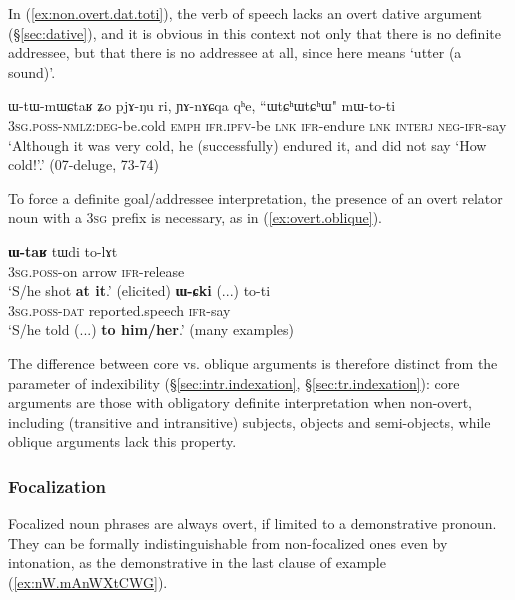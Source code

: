 In (\ref{ex:non.overt.dat.toti}), the verb of speech  lacks an overt dative argument (§\ref{sec:dative}), and it is obvious in this context not only that there is no definite addressee, but that there is no addressee at all, since  here means `utter (a sound)'. 

\begin{exe}
\ex \label{ex:non.overt.dat.toti}
\gll ɯ-tɯ-mɯɕtaʁ ʑo pjɤ-ŋu ri, ɲɤ-nɤɕqa qʰe, ``ɯtɕʰɯtɕʰɯ" mɯ-to-ti \\
\textsc{3sg}.\textsc{poss}-\textsc{nmlz}:\textsc{deg}-be.cold \textsc{emph} \textsc{ifr}.\textsc{ipfv}-be \textsc{lnk} \textsc{ifr}-endure \textsc{lnk} \textsc{interj} \textsc{neg}-\textsc{ifr}-say \\
\glt `Although it was very cold, he (successfully) endured it, and did not say `How cold!'.' (07-deluge, 73-74)
\end{exe}

To force a definite goal/addressee interpretation, the presence of an overt relator noun with a \textsc{3sg} prefix is necessary, as in (\ref{ex:overt.oblique}).

\begin{exe}
\ex \label{ex:overt.oblique}
\begin{xlist}
\ex \label{ex:WtaR.tWdi.tolAt}
\gll \textbf{ɯ-taʁ} tɯdi to-lɤt \\
\textsc{3sg}.\textsc{poss}-on arrow \textsc{ifr}-release \\
\glt `S/he shot \textbf{at it}.' (elicited)
\ex  \label{ex:WCki.toti2}
\gll \textbf{ɯ-ɕki} (...) to-ti \\
\textsc{3sg}.\textsc{poss}-\textsc{dat} reported.speech \textsc{ifr}-say \\
\textsc{\glt} `S/he told (...) \textbf{to him/her}.' (many examples)
\end{xlist}
\end{exe}

The difference between core vs. oblique arguments is therefore distinct from the parameter of indexibility (§\ref{sec:intr.indexation}, §\ref{sec:tr.indexation}): core arguments are those with obligatory definite interpretation when non-overt, including (transitive and intransitive) subjects, objects and semi-objects, while oblique arguments lack this property.

\subsubsection{Focalization} \label{sec:focalization.overt}
Focalized noun phrases are always overt, if limited to a demonstrative pronoun. They can be formally indistinguishable from non-focalized ones even by intonation, as the demonstrative  in the last clause of example (\ref{ex:nW.mAnWXtCWG}).

